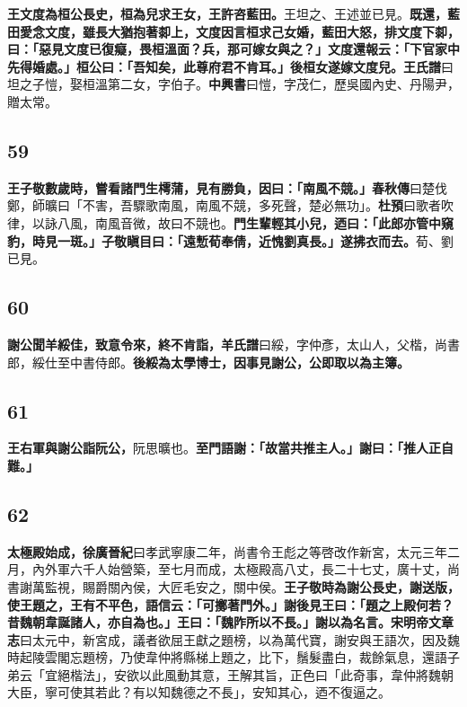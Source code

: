 \textbf{王文度為桓公長史，桓為兒求王女，王許咨藍田。}{\footnotesize 王坦之、王述並已見。}\textbf{既還，藍田愛念文度，雖長大猶抱著厀上，文度因言桓求己女婚，藍田大怒，排文度下厀，曰：「惡見文度已復癡，畏桓溫面？兵，那可嫁女與之？」文度還報云：「下官家中先得婚處。」桓公曰：「吾知矣，此尊府君不肯耳。」後桓女遂嫁文度兒。}{\footnotesize \textbf{王氏譜}曰坦之子愷，娶桓溫第二女，字伯子。\textbf{中興書}曰愷，字茂仁，歷吳國內史、丹陽尹，贈太常。}

\subsection*{59}

\textbf{王子敬數歲時，嘗看諸門生樗蒲，見有勝負，因曰：「南風不競。」}{\footnotesize \textbf{春秋傳}曰楚伐鄭，師曠曰「不害，吾驟歌南風，南風不競，多死聲，楚必無功」。\textbf{杜預}曰歌者吹律，以詠八風，南風音微，故曰不競也。}\textbf{門生輩輕其小兒，迺曰：「此郎亦管中窺豹，時見一斑。」子敬瞋目曰：「遠慙荀奉倩，近愧劉真長。」遂拂衣而去。}{\footnotesize 荀、劉已見。}

\subsection*{60}

\textbf{謝公聞羊綏佳，致意令來，終不肯詣，}{\footnotesize \textbf{羊氏譜}曰綏，字仲彥，太山人，父楷，尚書郎，綏仕至中書侍郎。}\textbf{後綏為太學博士，因事見謝公，公即取以為主簿。}

\subsection*{61}

\textbf{王右軍與謝公詣阮公，}{\footnotesize 阮思曠也。}\textbf{至門語謝：「故當共推主人。」謝曰：「推人正自難。」}

\subsection*{62}

\textbf{太極殿始成，}{\footnotesize \textbf{徐廣晉紀}曰孝武寧康二年，尚書令王彪之等啓改作新宮，太元三年二月，內外軍六千人始營築，至七月而成，太極殿高八丈，長二十七丈，廣十丈，尚書謝萬監視，賜爵關內侯，大匠毛安之，關中侯。}\textbf{王子敬時為謝公長史，謝送版，使王題之，王有不平色，語信云：「可擲著門外。」謝後見王曰：「題之上殿何若？昔魏朝韋誕諸人，亦自為也。」王曰：「魏阼所以不長。」謝以為名言。}{\footnotesize \textbf{宋明帝文章志}曰太元中，新宮成，議者欲屈王獻之題榜，以為萬代寶，謝安與王語次，因及魏時起陵雲閣忘題榜，乃使韋仲將縣梯上題之，比下，鬚髮盡白，裁餘氣息，還語子弟云「宜絕楷法」，安欲以此風動其意，王解其旨，正色曰「此奇事，韋仲將魏朝大臣，寧可使其若此？有以知魏德之不長」，安知其心，迺不復逼之。}

